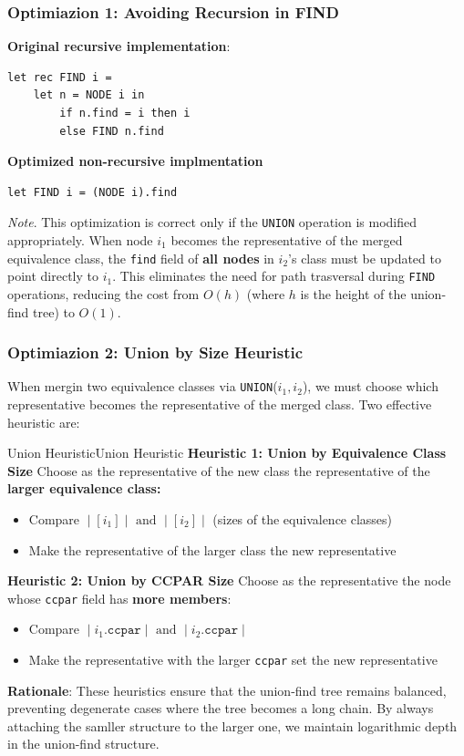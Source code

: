 \documentclass[a4paper]{article}
\theoremstyle{definition}
\begin{document}
\subsubsection{Optimiazion 1: Avoiding Recursion in FIND}
\textbf{Original recursive implementation}:
\begin{lstlisting}[style=ocamlpseudo]
let rec FIND i = 
	let n = NODE i in 
		if n.find = i then i 
		else FIND n.find
\end{lstlisting}
\textbf{Optimized non-recursive implmentation}
\begin{lstlisting}[style=ocamlpseudo]
let FIND i = (NODE i).find
\end{lstlisting}
\textit{Note}. This optimization is correct only if the \texttt{UNION} operation is modified appropriately. When 
node \( i_1 \) becomes the representative of the merged equivalence class, the \texttt{find} field of \textbf{all nodes}
in \( i_2 \)'s class must be updated to point directly to \( i_1 \).
\vspace{1em}
\noindent
\newline
This eliminates the need for path trasversal during \texttt{FIND} operations, reducing the cost from \( O(h) \) (where
\( h \) is the height of the union-find tree) to \( O(1) \).
\subsubsection{Optimiazion 2: Union by Size Heuristic}
When mergin two equivalence classes via \texttt{UNION}($i_1,i_2$), we must choose which representative becomes
the representative of the merged class. Two effective heuristic are:
\begin{definition}{Union Heuristic}{Union Heuristic}
\textbf{Heuristic 1: Union by Equivalence Class Size}
\vspace{1em}
\noindent
\newline
Choose as the representative of the new class the representative of the \textbf{larger equivalence class:}
\begin{itemize}
	\item Compare \( \;|\;[i_1]\;|\; \text{ and } \;|\;[i_2]\;|\; \) (sizes of the equivalence classes)
	\item Make the representative of the larger class the new representative
\end{itemize}
\textbf{Heuristic 2: Union by CCPAR Size}
\vspace{1em}
\noindent
\newline
Choose as the representative the node whose \texttt{ccpar} field has \textbf{more members}:
\begin{itemize}
	\item Compare \( \;|\;i_1.\texttt{ccpar}\;|\; \text{ and } \;|\;i_2.\texttt{ccpar}\;|\; \)
	\item Make the representative with the larger \texttt{ccpar} set the new representative
\end{itemize}
\end{definition}
\textbf{Rationale}: These heuristics ensure that the union-find tree remains balanced, preventing degenerate cases where 
the tree becomes a long chain. By always attaching the samller structure to the larger one, we maintain logarithmic depth in the 
union-find structure.
\end{document}

